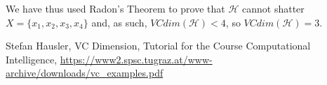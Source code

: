 \documentclass{article}
\begin{document}
We have thus used Radon's Theorem to prove that $\mathcal{H}$ cannot shatter $X=\{x_1,x_2,x_3,x_4\}$ and, as such, $VCdim(\mathcal{H}) < 4$, so $VCdim(\mathcal{H})=3$.
\newpage

\begin{thebibliography}{1.7} 
	 \color{cyan}Stefan Hausler, VC Dimension, Tutorial for the Course Computational Intelligence, \url{https://www2.spsc.tugraz.at/www-archive/downloads/vc_examples.pdf} \color{black}
	
\end{thebibliography}
\end{document}
